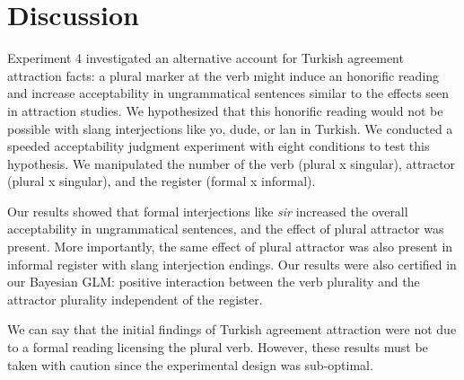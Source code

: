 \section{Discussion}

Experiment 4 investigated an alternative account for Turkish agreement attraction facts: a plural marker at the verb might induce an honorific reading and increase acceptability in ungrammatical sentences similar to the effects seen in attraction studies. We hypothesized that this honorific reading would not be possible with slang interjections like yo, dude, or lan in Turkish. We conducted a speeded acceptability judgment experiment with eight conditions to test this hypothesis. We manipulated the number of the verb (plural x singular), attractor (plural x singular), and the register (formal x informal).

Our results showed that formal interjections like \emph{sir} increased the overall acceptability in ungrammatical sentences, and the effect of plural attractor was present. More importantly, the same effect of plural attractor was also present in informal register with slang interjection endings. Our results were also certified in our Bayesian GLM: positive interaction between the verb plurality and the attractor plurality independent of the register. 

We can say that the initial findings of Turkish agreement attraction were not due to a formal reading licensing the plural verb. However, these results must be taken with caution since the experimental design was sub-optimal.


